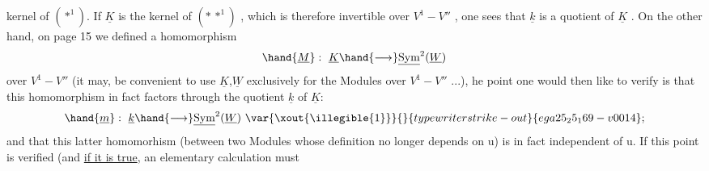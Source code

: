 kernel of $(*^1)$. If $\underline{K}$ is the kernel of $(*\,*^1)$ , which is therefore invertible over
$V^1-V''$ , one sees  that $\underline{k}$ is a quotient of $\underline{K}$ . On the other hand, on
page 15 we defined a homomorphism
\[ \hand{\underline{M}} : \ \underline{K}\hand{\longrightarrow}\underline{\mathrm{Sym}}^2(\underline{W}) \]
over $V^1-V''$ (it may, be convenient to use $\underline{K}$,$\underline{W}$ exclusively for the Modules
over $V^1-V''$ ...),  he point one would then like to verify
is that this homomorphism in fact factors through the quotient $\underline{k}$ of $\underline{K}$:
\[ \hand{\underline{m}} : \ \underline{k}\hand{\longrightarrow}\underline{\mathrm{Sym}}^2(\underline{W}) \ \var{\xout{\illegible{1}}}{}{typewriter strike-out}{ega25_25_169-v0014} ; \]
and that this latter homomorhism (between two Modules whose definition
 no longer depends on u) is in fact independent of
u. If this point is verified (and \uline{if it is true}, an elementary calculation must

